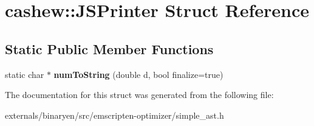\hypertarget{structcashew_1_1_j_s_printer}{}\section{cashew\+:\+:J\+S\+Printer Struct Reference}
\label{structcashew_1_1_j_s_printer}
\subsection*{Static Public Member Functions}
\begin{DoxyCompactItemize}
\item 
\mbox{\label{structcashew_1_1_j_s_printer_a3962d65e55166af7d6432ac2a27de7b1}} 
static char $\ast$ {\bfseries num\+To\+String} (double d, bool finalize=true)
\end{DoxyCompactItemize}


The documentation for this struct was generated from the following file\+:\begin{DoxyCompactItemize}
\item 
externals/binaryen/src/emscripten-\/optimizer/simple\+\_\+ast.\+h\end{DoxyCompactItemize}
